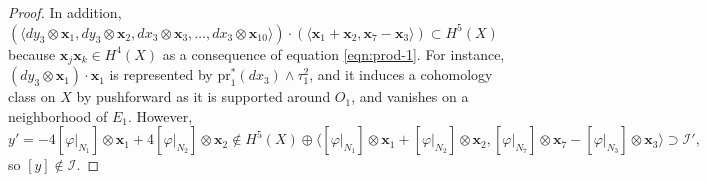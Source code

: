 \documentclass[10pt]{article}
\newcommand{\la}{\langle}
\newcommand{\ra}{\rangle}
\theoremstyle{plain}
\theoremstyle{definition}
\theoremstyle{remark}
\begin{document}
\begin{proof}
In addition, 
$(\la dy_3 \otimes \mathbf{x}_1, dy_3 \otimes \mathbf{x}_2, dx_3 \otimes \mathbf{x}_3, \dots, dx_3 \otimes \mathbf{x}_{10} \ra)\cdot (\la \mathbf{x}_1+\mathbf{x}_2 ,\mathbf{x}_7-\mathbf{x}_3\ra)  \subset H^5(X)$ because
 $\mathbf{x}_j\mathbf{x}_k \in H^4(X)$ as a consequence of equation \eqref{eqn:prod-1}. For instance, $(dy_3\otimes \mathbf{x}_1) \cdot \mathbf{x}_1$ is represented by $\mathrm{pr}_1^*(dx_3) \wedge \tau_1^2$, and it induces a cohomology class on $X$ by pushforward as it is supported around $O_1$, and vanishes on a neighborhood of $E_1$. However, 
 $$
 y'=-4[\varphi|_{N_1}] \otimes \mathbf{x}_1 +4[\varphi|_{N_2}]\otimes \mathbf{x}_2 \notin H^5(X) \oplus \la [\varphi|_{N_1}]\otimes \mathbf{x}_1+[\varphi|_{N_2}]\otimes \mathbf{x}_2, [\varphi|_{N_7}]\otimes \mathbf{x}_7-[\varphi|_{N_3}]\otimes \mathbf{x}_3 \ra \supset \mathcal{I}',
 $$
 so $[y]\notin \mathcal{I}$.
\end{proof}
\end{document}
